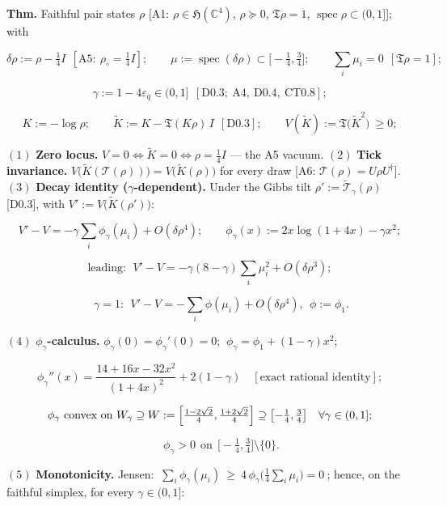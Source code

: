\begin{theorem}\label{tag:L1}
\textbf{Thm.} Faithful pair states $\rho$ [A1: $\rho\in\mathfrak H(\mathbb C^4)$, $\rho\succeq0$, $\mathfrak T\rho=1$, $\operatorname{spec}\rho\subset(0,1]$]; with

\[
\delta\rho:=\rho-\tfrac14I\ \ [\mathrm{A5}:\ \rho_\circ=\tfrac14I];\qquad
\mu:=\operatorname{spec}(\delta\rho)\subset\bigl[-\tfrac14,\tfrac34\bigr];\qquad
\textstyle\sum_i\mu_i=0\ \ [\mathfrak T\rho=1];
\]

\[
\gamma:=1-4\varepsilon_q\in(0,1]\ \ [\mathrm{D0.3};\ \mathrm{A4},\ \mathrm{D0.4},\ \mathrm{CT0.8}];
\]

\[
K:=-\log\rho;\qquad
\tilde K:=K-\mathfrak T(K\rho)\,I\ \ [\mathrm{D0.3}];\qquad
V(\tilde K):=\mathfrak T\bigl(\tilde K^2\bigr)\ \ge0;
\]

$(1)$ \textbf{Zero locus.} $V=0\iff\tilde K=0\iff\rho=\tfrac14I$ — the A5 vacuum. $(2)$ \textbf{Tick invariance.} $V\bigl(\tilde K(\mathcal T(\rho))\bigr)=V\bigl(\tilde K(\rho)\bigr)$ for every draw [A6: $\mathcal T(\rho)=U\rho U^\dagger$]. $(3)$ \textbf{Decay identity ($\gamma$-dependent).} Under the Gibbs tilt $\rho':=\tilde{\mathcal T}_\gamma(\rho)$ [D0.3], with $V':=V\bigl(\tilde K(\rho')\bigr)$:

\[
V'-V=-\gamma\sum_i\phi_\gamma(\mu_i)+O(\delta\rho^4);\qquad
\phi_\gamma(x):=2x\log(1+4x)-\gamma x^2;
\]

\[
\text{leading}:\ \ V'-V=-\gamma(8-\gamma)\textstyle\sum_i\mu_i^2+O(\delta\rho^3);
\]

\[
\qquad \gamma=1:\ \ V'-V=-\textstyle\sum_i\phi(\mu_i)+O(\delta\rho^4),\ \ \phi:=\phi_1 .
\]

$(4)$ \textbf{$\phi_\gamma$-calculus.} $\phi_\gamma(0)=\phi_\gamma'(0)=0$; $\ \phi_\gamma=\phi_1+(1-\gamma)x^2$;

\[
\phi_\gamma''(x)=\frac{14+16x-32x^2}{(1+4x)^2}+2(1-\gamma)\quad[\text{exact rational identity}];
\]

\[
\phi_\gamma\ \text{convex on}\ W_\gamma\supseteq W:=\Bigl[\tfrac{1-2\sqrt2}{4},\tfrac{1+2\sqrt2}{4}\Bigr]\supseteq\bigl[-\tfrac14,\tfrac34\bigr]\quad\forall\gamma\in(0,1];
\]

\[
\qquad \phi_\gamma>0\ \ \text{on}\ \ \bigl[-\tfrac14,\tfrac34\bigr]\setminus\{0\}.
\]

$(5)$ \textbf{Monotonicity.} Jensen: $\ \sum_i\phi_\gamma(\mu_i)\ \ge\ 4\,\phi_\gamma\bigl(\tfrac14\sum_i\mu_i\bigr)=0\ $; hence, on the faithful simplex, for every $\gamma\in(0,1]$:


\end{theorem}
